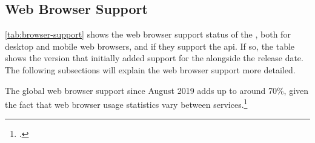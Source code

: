 \subsection{Web Browser Support}

\autoref{tab:browser-support} shows the web browser support status of the \wa{}, both for desktop and mobile web browsers, and if they support the \gls{api}. If so, the table shows the version that initially added support for the \wa{} alongside the release date. The following subsections will explain the web browser support more detailed.

The global web browser support since August 2019 adds up to around 70\%, given the fact that web browser usage statistics vary between services.\footcites[The obtained data is available in the Appendix \autoref{sec:stats}, see][]{statcounter-global}

\newpage

